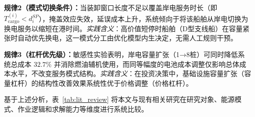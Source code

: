 \documentclass[UTF8, a4paper, 12pt]{ctexart}
\theoremstyle{plain}
\theoremstyle{definition}
\theoremstyle{remark}
\begin{document}
\textbf{规律2（模式切换条件）：}当装卸窗口长度不足以覆盖岸电服务时长（即 $T^{(i)}_{\text{cargo}} < d_i^{SP}$），掩盖效应失效，延误成本上升，系统倾向于将该船舶从岸电切换为换电服务以缩短在港时间。\emph{实践含义}：高价值短停时船舶（D型支线船）在容量紧张时自动优先换电，这一模式分工由优化模型内生决定，无需人工规则干预。

\textbf{规律3（杠杆优先级）：}敏感性实验表明，岸电容量扩张（1→8桩）可同时降低系统总成本 $32.7\%$ 并消除燃油辅机使用，而同等幅度的电池成本调整仅影响总体成本水平，不改变服务模式结构。\emph{实践含义}：在投资决策中，基础设施容量扩张（容量杠杆）的结构性改善效果系统性优于价格调整（价格杠杆）。
 
基于上述分析，表~\ref{tab:lit_review} 将本文与现有相关研究在研究对象、能源模式、作业逻辑和求解能力等维度进行系统比较。
 
\end{document}
